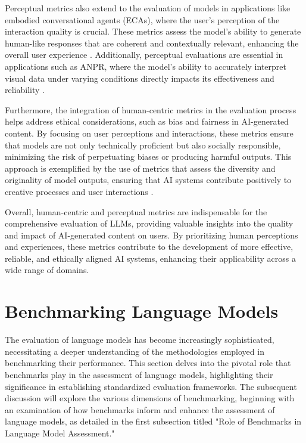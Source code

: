 Perceptual metrics also extend to the evaluation of models in applications like embodied conversational agents (ECAs), where the user's perception of the interaction quality is crucial. These metrics assess the model's ability to generate human-like responses that are coherent and contextually relevant, enhancing the overall user experience \cite{korre2023takesvillagemultidisciplinaritycollaboration}. Additionally, perceptual evaluations are essential in applications such as ANPR, where the model's ability to accurately interpret visual data under varying conditions directly impacts its effectiveness and reliability \cite{adak2022automaticnumberplaterecognition}.



Furthermore, the integration of human-centric metrics in the evaluation process helps address ethical considerations, such as bias and fairness in AI-generated content. By focusing on user perceptions and interactions, these metrics ensure that models are not only technically proficient but also socially responsible, minimizing the risk of perpetuating biases or producing harmful outputs. This approach is exemplified by the use of metrics that assess the diversity and originality of model outputs, ensuring that AI systems contribute positively to creative processes and user interactions \cite{palmini2024patternscreativityuserinput}.



Overall, human-centric and perceptual metrics are indispensable for the comprehensive evaluation of LLMs, providing valuable insights into the quality and impact of AI-generated content on users. By prioritizing human perceptions and experiences, these metrics contribute to the development of more effective, reliable, and ethically aligned AI systems, enhancing their applicability across a wide range of domains.













\section{Benchmarking Language Models} \label{sec:Benchmarking Language Models}



The evaluation of language models has become increasingly sophisticated, necessitating a deeper understanding of the methodologies employed in benchmarking their performance. This section delves into the pivotal role that benchmarks play in the assessment of language models, highlighting their significance in establishing standardized evaluation frameworks. The subsequent discussion will explore the various dimensions of benchmarking, beginning with an examination of how benchmarks inform and enhance the assessment of language models, as detailed in the first subsection titled "Role of Benchmarks in Language Model Assessment."









